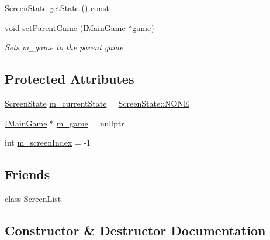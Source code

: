 \begin{DoxyCompactItemize}
\item 
\hyperlink{namespace_otherwise_ab18c192ed63e79f9243b937d42c1fc7b}{Screen\+State} \hyperlink{class_otherwise_1_1_i_game_screen_a1da147eb4e09accedea878a74093366f}{get\+State} () const
\item 
void \hyperlink{class_otherwise_1_1_i_game_screen_acd294c856020219166d4ed4a4c15a932}{set\+Parent\+Game} (\hyperlink{class_otherwise_1_1_i_main_game}{I\+Main\+Game} $\ast$game)
\begin{DoxyCompactList}\small\item\em Sets m\+\_\+game to the parent game. \end{DoxyCompactList}\end{DoxyCompactItemize}
\subsection*{Protected Attributes}
\begin{DoxyCompactItemize}
\item 
\hyperlink{namespace_otherwise_ab18c192ed63e79f9243b937d42c1fc7b}{Screen\+State} \hyperlink{class_otherwise_1_1_i_game_screen_a4a0f49624a04c2a4a67cc6d23404f7a4}{m\+\_\+current\+State} = \hyperlink{namespace_otherwise_ab18c192ed63e79f9243b937d42c1fc7bab50339a10e1de285ac99d4c3990b8693}{Screen\+State\+::\+N\+O\+NE}
\item 
\hyperlink{class_otherwise_1_1_i_main_game}{I\+Main\+Game} $\ast$ \hyperlink{class_otherwise_1_1_i_game_screen_aa0fcd866e31b74e406fbbb03e7f78640}{m\+\_\+game} = nullptr
\item 
int \hyperlink{class_otherwise_1_1_i_game_screen_abbc431d58e99d00601ce75b3bedfbc3f}{m\+\_\+screen\+Index} = -\/1
\end{DoxyCompactItemize}
\subsection*{Friends}
\begin{DoxyCompactItemize}
\item 
class \hyperlink{class_otherwise_1_1_i_game_screen_a042de5c9a180f704d965d6a6d0ca6e11}{Screen\+List}
\end{DoxyCompactItemize}


\subsection{Constructor \& Destructor Documentation}
\mbox{\label{class_otherwise_1_1_i_game_screen_a856ccdcb7cd54e77aed29bf949f3d55c}} 
